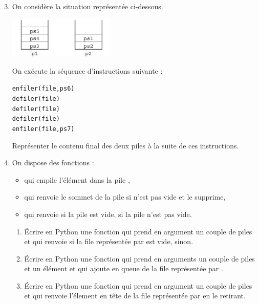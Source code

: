 \documentclass[11pt,a4paper,french,twoside]{PMCours}
\begin{document}
\newpage
\begin{enumerate}\setcounter{enumi}{2}
\item On considère la situation représentée ci-dessous.

\includegraphics[width=0.4\textwidth]{BacBlanc2Sujet2_NSI2122-img2.png}

On exécute la séquence d'instructions suivante :
\begin{alltt}
enfiler(file,ps6)
defiler(file)
defiler(file)
defiler(file)
enfiler(file,ps7)
\end{alltt}
Représenter le contenu final des deux piles à la suite de ces instructions.
\item On dispose des fonctions :
\begin{itemize}
    \item {} qui empile l'élément  dans la pile ,
    \item {} qui renvoie le sommet de la pile  si  n'est pas vide et le
    supprime,
    \item {} qui renvoie  si la pile  est vide,  si la pile  n'est
    pas vide.
\end{itemize}
\begin{enumerate}
    \item Écrire en Python une fonction  qui prend en argument un couple de
    piles  et qui renvoie  si la file représentée par  est vide,  sinon.
    \item Écrire en Python une fonction  qui prend en arguments un couple de
    piles  et un élément  et qui ajoute  en queue de la file représentée par .
    \item Écrire en Python une fonction  qui prend en argument un couple de piles 
    et qui renvoie l'élement en tête de la file représentée par  en le retirant.
\end{enumerate}
\end{enumerate}
\end{document}

